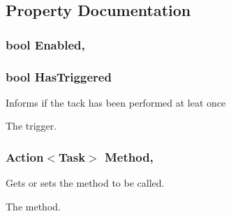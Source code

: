 \subsection{Property Documentation}
\hypertarget{classOTA_1_1Misc_1_1Task_a558f5c44426d0eb7abb82a65e8892d9a}{}
\subsubsection[{Enabled}]{\setlength{\rightskip}{0pt plus 5cm}bool Enabled\hspace{0.3cm}{\ttfamily [get]}, {\ttfamily [set]}}\label{classOTA_1_1Misc_1_1Task_a558f5c44426d0eb7abb82a65e8892d9a}
\hypertarget{classOTA_1_1Misc_1_1Task_a5a196897933429df04c9726ecf7fd14f}{}
\subsubsection[{Has\+Triggered}]{\setlength{\rightskip}{0pt plus 5cm}bool Has\+Triggered\hspace{0.3cm}{\ttfamily [get]}}\label{classOTA_1_1Misc_1_1Task_a5a196897933429df04c9726ecf7fd14f}


Informs if the tack has been performed at leat once 

The trigger. \hypertarget{classOTA_1_1Misc_1_1Task_a53b4da75fbd8d468e2ab275e5487e997}{}
\subsubsection[{Method}]{\setlength{\rightskip}{0pt plus 5cm}Action$<${\bf Task}$>$ Method\hspace{0.3cm}{\ttfamily [get]}, {\ttfamily [set]}}\label{classOTA_1_1Misc_1_1Task_a53b4da75fbd8d468e2ab275e5487e997}


Gets or sets the method to be called. 

The method. \hypertarget{classOTA_1_1Misc_1_1Task_af920af1428f98e67fa8ee94e39cc691e}{}
